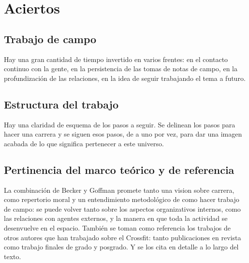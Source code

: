\section{Aciertos}\label{aciertos}

\subsection{Trabajo de campo}\label{trabajo-de-campo}

Hay una gran cantidad de tiempo invertido en varios frentes: en el
contacto continuo con la gente, en la persistencia de las tomas de notas
de campo, en la profundización de las relaciones, en la idea de seguir
trabajando el tema a futuro.

\subsection{Estructura del trabajo}\label{estructura-del-trabajo}

Hay una claridad de esquema de los pasos a seguir. Se delinean los pasos
para hacer una carrera y se siguen esos pasos, de a uno por vez, para
dar una imagen acabada de lo que significa pertenecer a este universo.

\subsection{Pertinencia del marco teórico y de
referencia}\label{pertinencia-del-marco-teuxf3rico-y-de-referencia}

La combinación de Becker y Goffman promete tanto una vision sobre
carrera, como repertorio moral y un entendimiento metodológico de como
hacer trabajo de campo: se puede volver tanto sobre los aspectos
organizativos internos, como las relaciones con agentes externos, y la
manera en que toda la actividad se desenvuelve en el espacio. También se
toman como referencia los trabajos de otros autores que han trabajado
sobre el Crossfit: tanto publicaciones en revista como trabajo finales
de grado y posgrado. Y se los cita en detalle a lo largo del texto.